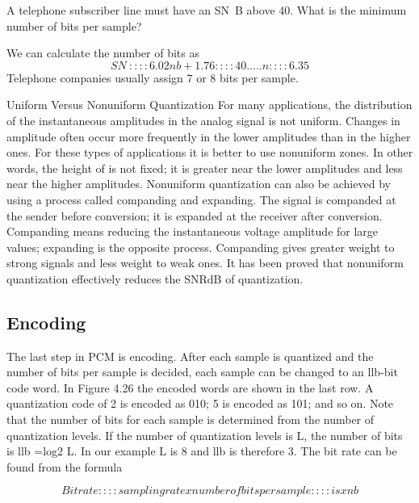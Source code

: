 \vspace{12pt}

\begin{example}
  A telephone subscriber line must have an SN~B above 40. What is the minimum number of bits per sample?
\end{example}

\begin{solution}
  We can calculate the number of bits as
  \begin{equation*}
    SN~:::: 6.02nb + 1.76:::: 40 ..... n:::: 6.35
  \end{equation*}
  \noindent Telephone companies usually assign 7 or 8 bits per sample.
\end{solution}

Uniform Versus Nonuniform Quantization For many applications, the distribution of the instantaneous amplitudes in the analog signal is not uniform. Changes in amplitude often occur more frequently in the lower amplitudes than in the higher ones. For these types of applications it is better to use nonuniform zones. In other words, the height of is not fixed; it is greater near the lower amplitudes and less near the higher amplitudes. Nonuniform quantization can also be achieved by using a process called companding and expanding. The signal is companded at the sender before conversion; it is expanded at the receiver after conversion. Companding means reducing the instantaneous voltage amplitude for large values; expanding is the opposite process. Companding gives greater weight to strong signals and less weight to weak ones. It has been proved that nonuniform quantization effectively reduces the SNRdB of quantization.

\subsection*{Encoding}
The last step in PCM is encoding. After each sample is quantized and the number of bits per sample is decided, each sample can be changed to an llb-bit code word. In Figure 4.26 the encoded words are shown in the last row. A quantization code of 2 is encoded as 010; 5 is encoded as 101; and so on. Note that the number of bits for each sample is determined from the number of quantization levels. If the number of quantization levels is L, the number of bits is llb =log2 L. In our example L is 8 and llb is therefore 3. The bit rate can be found from the formula

\begin{equation}
  Bit rate :::: sampling rate x number of bits per sample::::is x nb
\end{equation}

